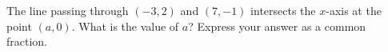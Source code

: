 The line passing through $(-3,2)$ and $(7,-1)$ intersects the $x$-axis at the point $(a,0)$. What is the value of $a$? Express your answer as a common fraction.

